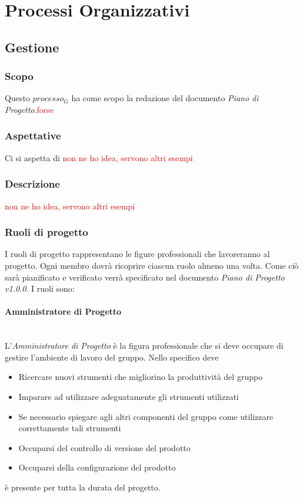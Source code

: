 \section{Processi Organizzativi}


\subsection{Gestione}

	\subsubsection{Scopo}
	Questo $processo_G$ ha come scopo la redazione del documento \emph{Piano di Progetto}.\textcolor{red}{forse}
	\subsubsection{Aspettative}
	Ci si aspetta di \textcolor{red}{non ne ho idea, servono altri esempi}
	\subsubsection{Descrizione} 
	\textcolor{red}{non ne ho idea, servono altri esempi}
	\subsubsection{Ruoli di progetto} 
	I ruoli di progetto rappresentano le figure professionali che lavoreranno al progetto.  Ogni membro dovrà ricoprire ciascun ruolo almeno una volta. Come ciò sarà pianificato e verificato verrà specificato nel documento \emph{Piano di Progetto v1.0.0}. I ruoli sono:
		\paragraph{Amministratore di Progetto} \mbox{} \\
		L'\emph{Amministratore di Progetto} è la figura professionale che si deve occupare di gestire l'ambiente di lavoro del gruppo. Nello specifico deve
		\begin{itemize}
			\item Ricercare nuovi strumenti che migliorino la produttività del gruppo
			\item Imparare ad utilizzare adeguatamente gli strumenti utilizzati
			\item Se necessario spiegare agli altri componenti del gruppo come utilizzare correttamente tali strumenti
			\item Occuparsi del controllo di versione del prodotto 
			\item Occuparsi della configurazione del prodotto
		\end{itemize}
		è presente per tutta la durata del progetto.
